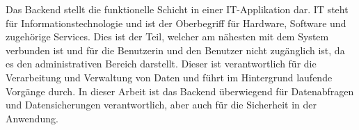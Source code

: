 Das Backend stellt die funktionelle Schicht in einer IT-Applikation dar. IT steht für Informationstechnologie und ist der Oberbegriff für Hardware, Software und zugehörige Services. Dies ist der Teil, welcher am nähesten mit dem System verbunden ist und für die Benutzerin und den Benutzer nicht zugänglich ist, da es den administrativen Bereich darstellt. Dieser ist verantwortlich für die Verarbeitung und Verwaltung von Daten und führt im Hintergrund laufende Vorgänge durch. In dieser Arbeit ist das Backend überwiegend für Datenabfragen und Datensicherungen verantwortlich, aber auch für die Sicherheit in der Anwendung.
\cite{Backend_Basics}